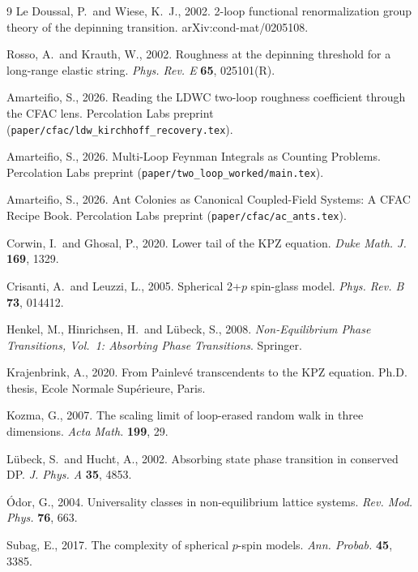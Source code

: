 \documentclass[10pt,a4paper,twocolumn]{article}
\theoremstyle{plain}
\theoremstyle{definition}
\begin{document}
\begin{thebibliography}{9}
  Le Doussal, P.\ and Wiese, K.~J., 2002.
  2-loop functional renormalization group theory of the depinning
  transition.
  arXiv:cond-mat/0205108.

  Rosso, A.\ and Krauth, W., 2002.
  Roughness at the depinning threshold for a long-range elastic
  string.
  \textit{Phys. Rev. E} \textbf{65}, 025101(R).

  Amarteifio, S., 2026.
  Reading the LDWC two-loop roughness coefficient through the
  CFAC lens.
  Percolation Labs preprint
  (\texttt{paper/cfac/ldw\_kirchhoff\_recovery.tex}).

  Amarteifio, S., 2026.
  Multi-Loop Feynman Integrals as Counting Problems.
  Percolation Labs preprint
  (\texttt{paper/two\_loop\_worked/main.tex}).

  Amarteifio, S., 2026.
  Ant Colonies as Canonical Coupled-Field Systems: A CFAC Recipe Book.
  Percolation Labs preprint
  (\texttt{paper/cfac/ac\_ants.tex}).

  Corwin, I.\ and Ghosal, P., 2020.
  Lower tail of the KPZ equation.
  \textit{Duke Math. J.} \textbf{169}, 1329.

  Crisanti, A.\ and Leuzzi, L., 2005.
  Spherical 2+$p$ spin-glass model.
  \textit{Phys. Rev. B} \textbf{73}, 014412.

  Henkel, M., Hinrichsen, H.\ and L\"ubeck, S., 2008.
  \textit{Non-Equilibrium Phase Transitions, Vol.\ 1:
  Absorbing Phase Transitions}.  Springer.

  Krajenbrink, A., 2020.
  From Painlev\'e transcendents to the KPZ equation.
  Ph.D. thesis, Ecole Normale Sup\'erieure, Paris.

  Kozma, G., 2007.
  The scaling limit of loop-erased random walk in three dimensions.
  \textit{Acta Math.} \textbf{199}, 29.

  L\"ubeck, S.\ and Hucht, A., 2002.
  Absorbing state phase transition in conserved DP.
  \textit{J. Phys. A} \textbf{35}, 4853.

  \'Odor, G., 2004.
  Universality classes in non-equilibrium lattice systems.
  \textit{Rev. Mod. Phys.} \textbf{76}, 663.

  Subag, E., 2017.
  The complexity of spherical $p$-spin models.
  \textit{Ann. Probab.} \textbf{45}, 3385.

\end{thebibliography}
\end{document}
